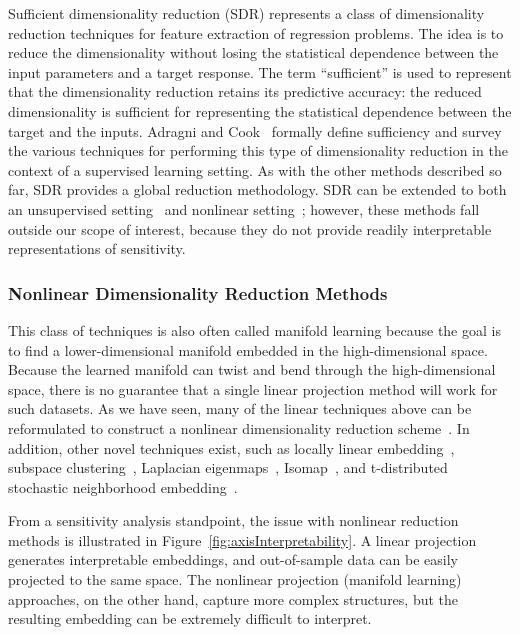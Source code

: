 Sufficient dimensionality reduction (SDR) represents a class of dimensionality reduction techniques for feature extraction of regression problems.
%
The idea is to reduce the dimensionality without losing the statistical dependence between the input parameters and a target response.
%
The term ``sufficient'' is used to represent that the dimensionality reduction retains its predictive accuracy: the reduced dimensionality is sufficient for representing the statistical dependence between the target and the inputs.
%
Adragni and Cook~\cite{AdragniCook2009} formally define sufficiency and survey the various techniques for performing this type of dimensionality reduction in the context of a supervised learning setting.
%
As with the other methods described so far, SDR provides a global reduction methodology.
%
SDR can be extended to both an unsupervised setting~\cite{WangShaJordan2010} and nonlinear setting~\cite{FukumizuBachJordan2004,FukumizuBachJordan2009,NilssonShaJordan2007}; however, these methods fall outside our scope of interest, because they do not provide readily interpretable representations of sensitivity.

\subsubsection{Nonlinear Dimensionality Reduction Methods}
\label{sec:nonlinearDR}

This class of techniques is also often called manifold learning because the goal is to find a lower-dimensional manifold embedded in the high-dimensional space.
%
Because the learned manifold can twist and bend through the high-dimensional space, there is no guarantee that a single linear projection method will work for such datasets.
%
As we have seen, many of the linear techniques above can be reformulated to construct a nonlinear dimensionality reduction scheme~\cite{ScholkopfSmolaMuller1997,CollinsDasguptaSchapire2001,MohamedGhahramaniHeller2009,HyvarinenKarhunenOja2001,MikaRatschWeston1999,McLachlan2004,FukumizuBachJordan2004,FukumizuBachJordan2009,NilssonShaJordan2007}.
%
In addition, other novel techniques exist, such as locally linear embedding~\cite{RoweisSaul2000}, subspace clustering~\cite{Parsons2004}, Laplacian eigenmaps~\cite{BelkinNiyogi2003}, Isomap~\cite{TenenbaumSilvaLangford2000}, and t-distributed stochastic neighborhood embedding~\cite{MaatenHinton2008}.

From a sensitivity analysis standpoint, the issue with nonlinear reduction methods is illustrated in Figure~\ref{fig:axisInterpretability}.
%
A linear projection generates interpretable embeddings, and out-of-sample data can be easily projected to the same space.
%
The nonlinear projection (manifold learning) approaches, on the other hand, capture more complex structures, but the resulting embedding can be extremely difficult to interpret.
%

